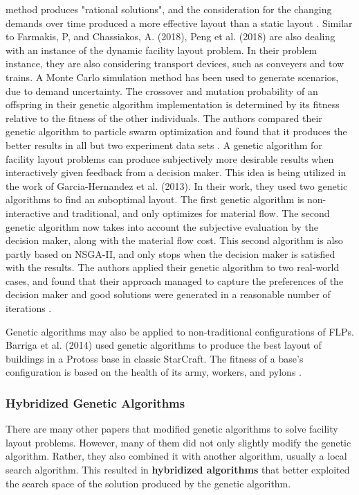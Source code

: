 method produces "rational solutions", and the consideration for the changing demands over time produced a more effective layout than a static layout \cite{Farmakis2018}. Similar to Farmakis, P, and Chassiakos, A. (2018), Peng et al. (2018) are also dealing with an instance of the dynamic facility layout problem. In their problem instance, they are also considering transport devices, such as conveyers and tow trains. A Monte Carlo simulation method has been used to generate scenarios, due to demand uncertainty. The crossover and mutation probability of an offspring in their genetic algorithm implementation is determined by its fitness relative to the fitness of the other individuals. The authors compared their genetic algorithm to particle swarm optimization and found that it produces the better results in all but two experiment data sets \cite{Peng2018}. A genetic algorithm for facility layout problems can produce subjectively more desirable results when interactively given feedback from a decision maker. This idea is being utilized in the work of Garcia-Hernandez et al. (2013). In their work, they used two genetic algorithms to find an suboptimal layout. The first genetic algorithm is non-interactive and traditional, and only optimizes for material flow. The second genetic algorithm now takes into account the subjective evaluation by the decision maker, along with the material flow cost. This second algorithm is also partly based on NSGA-II, and only stops when the decision maker is satisfied with the results. The authors applied their genetic algorithm to two real-world cases, and found that their approach managed to capture the preferences of the decision maker and good solutions were generated in a reasonable number of iterations \cite{Garcia-Hernandez2013}.

Genetic algorithms may also be applied to non-traditional configurations of FLPs. Barriga et al. (2014) used genetic algorithms to produce the best layout of buildings in a Protoss base in classic StarCraft. The fitness of a base's configuration is based on the health of its army, workers, and pylons \cite{Barriga2014}. %

\subsubsection{Hybridized Genetic Algorithms}
There are many other papers that modified genetic algorithms to solve facility layout problems. However, many of them did not only slightly modify the genetic algorithm. Rather, they also combined it with another algorithm, usually a local search algorithm. This resulted in \textbf{hybridized algorithms} that better exploited the search space of the solution produced by the genetic algorithm.

